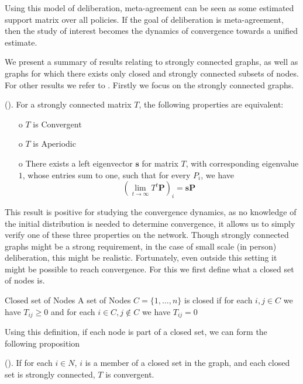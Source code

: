Using this model of deliberation, meta-agreement can be seen as some estimated
support matrix over all policies. If the goal of deliberation is
meta-agreement, then the study of interest becomes the dynamics of convergence
towards a unified estimate.

We present a summary of results relating to strongly connected graphs, as well
as graphs for which there exists only closed and strongly connected subsets of
nodes. For other results we refer to \citet{golubNaiveLearningSocial2010}.
Firstly we focus on the strongly connected graphs.

\begin{proposition}{(\citet{golubNaiveLearningSocial2010}).} For a strongly
	connected matrix \(T\), the following properties are equivalent:
	\begin{itemize} \item[o] \(T\) is Convergent \item[o] \(T\) is
		Aperiodic \item[o] There exists a left eigenvector
		\(\boldsymbol{s}\) for matrix \(T\), with corresponding
		eigenvalue \(1\), whose entries sum to one, such that for every
		$P_i$, we have \[\left(\lim_{t\to \infty}T^{t}
	\boldsymbol{P}\right)_{i} = \boldsymbol{s}\boldsymbol{P}\]
\end{itemize} \end{proposition}

This result is positive for studying the convergence dynamics, as no knowledge
of the initial distribution is needed to determine convergence, it allows us to
simply verify one of these three properties on the network. Though strongly
connected graphs might be a strong requirement, in the case of small scale (in
person) deliberation, this might be realistic. Fortunately, even outside this
setting it might be possible to reach convergence. For this we first define
what a closed set of nodes is.

\begin{definition}{Closed set of Nodes}{} A set of Nodes \(C = \{1, \dots,
n\}\) is closed if for each \(i,j \in C\) we have $T_{ij} \geq 0$ and for each
\(i \in C, j \notin C\) we have \(T_{ij} = 0\) \end{definition}

Using this definition, if each node is part of a closed set, we can form the
following proposition

\begin{proposition}{(\citet{golubNaiveLearningSocial2010}).} If for each \(i
\in N\), \(i\) is a member of a closed set in the graph, and each closed set is
strongly connected, \(T\) is convergent. \end{proposition}

